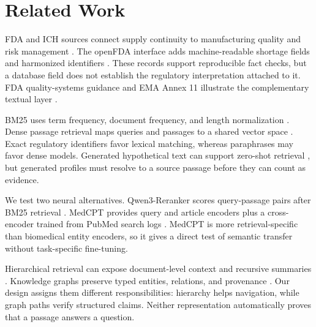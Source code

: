 \section{Related Work}
\label{sec:related}

FDA and ICH sources connect supply continuity to manufacturing quality and risk management \cite{fda2019shortages,ichQ9R1}. The openFDA interface adds machine-readable shortage fields and harmonized identifiers \cite{openfdaShortages}. These records support reproducible fact checks, but a database field does not establish the regulatory interpretation attached to it. FDA quality-systems guidance and EMA Annex 11 illustrate the complementary textual layer \cite{fdaQualitySystems2006,ecAnnex11}.

BM25 uses term frequency, document frequency, and length normalization \cite{robertson2009bm25}. Dense passage retrieval maps queries and passages to a shared vector space \cite{karpukhin2020dpr}. Exact regulatory identifiers favor lexical matching, whereas paraphrases may favor dense models. Generated hypothetical text can support zero-shot retrieval \cite{gao2023hyde}, but generated profiles must resolve to a source passage before they can count as evidence.

We test two neural alternatives. Qwen3-Reranker scores query-passage pairs after BM25 retrieval \cite{zhang2025qwen3embedding}. MedCPT provides query and article encoders plus a cross-encoder trained from PubMed search logs \cite{jin2023medcpt}. MedCPT is more retrieval-specific than biomedical entity encoders, so it gives a direct test of semantic transfer without task-specific fine-tuning.

Hierarchical retrieval can expose document-level context and recursive summaries \cite{sarthi2024raptor}. Knowledge graphs preserve typed entities, relations, and provenance \cite{hogan2021knowledgegraphs}. Our design assigns them different responsibilities: hierarchy helps navigation, while graph paths verify structured claims. Neither representation automatically proves that a passage answers a question.
